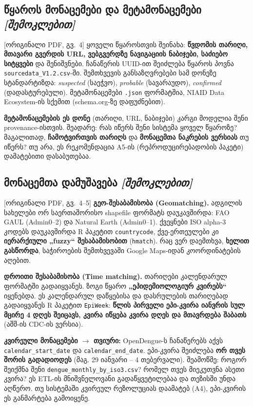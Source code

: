 \documentclass[11pt,a4paper]{article}
\newcommand{\imp}[1]{\textbf{\color{importred}#1}}
\newcommand{\pg}[1]{{\small\color{gray}[ორიგინალი PDF, გვ.~#1]}}
\begin{document}
\subsection*{წყაროს მონაცემები და მეტამონაცემები \textit{[შემოკლებით]}} \pg{4}
ყოველი წყაროსთვის შეინახა: \imp{წვდომის თარიღი, მთავარი გვერდის URL, ვებგვერდზე ნავიგაციის ნაბიჯები, საძიებო სიტყვები} და
შენიშვნები. ჩანაწერის UUID-ით შეიძლება წყაროს პოვნა \texttt{sourcedata\_V1.2.csv}-ში. შემთხვევის განსაზღვრებები სამ დონეზე
სტანდარტიზდა: \textit{suspected} (საეჭვო), \textit{probable} (სავარაუდო), \textit{confirmed} (დადასტურებული). მეტამონაცემები
\texttt{.json} ფორმატშია, NIAID Data Ecosystem-ის სქემით (schema.org-ზე დაფუძნებით).

\begin{etl}
\textbf{მეტამონაცემების ეს დონე} (თარიღი, URL, ნაბიჯები) კარგი მოდელია შენი provenance-ისთვის. შეადარე: რას იწერს შენი სისტემა
ყოველ წყაროზე? მაგალითად, \imp{ჩამოტვირთვის თარიღს} და \imp{მონაცემთა ნაკრების ვერსიას} თუ იწერს? თუ არა, ეს რეკომენდაცია A5-ის
(რეპროდუცირებადობის პაკეტი) დამატებითი დასაბუთებაა.
\end{etl}

\subsection*{მონაცემთა დამუშავება \textit{[შემოკლებით]}} \pg{4--5}
\textbf{გეო-შესაბამისობა (Geomatching).} ადგილის სახელები ორ საერთაშორისო shapefile ფორმატს დაუკავშირდა: FAO GAUL (Admin0--2)
და Natural Earth (Admin0--1). ქვეყნები ISO alpha-3 კოდებს დაუკავშირდა R პაკეტით \texttt{countrycode}, ქვე-ერთეულები კი
\imp{იერარქიული „fuzzy“ შესაბამისობით} (\texttt{hmatch}). რაც ვერ დაემთხვა, \imp{ხელით გასწორდა}, საჭიროების შემთხვევაში
Google Maps-იდან კოორდინატების აღებით.

\textbf{დროითი შესაბამისობა (Time matching).} თარიღები კალენდარულ ფორმატში გადაიყვანეს. ზოგი წყარო \imp{„ეპიდემიოლოგიურ კვირებს“}
იყენებდა. ეს კალენდარულ დაწყებისა და დასრულების თარიღებად გადაიყვანეს R პაკეტით \texttt{EpiWeek}: \imp{წლის პირველი ეპი-კვირა
იანვრის სულ მცირე 4 დღეს შეიცავს, კვირა იწყება კვირა დღეს და მთავრდება შაბათს} (აშშ-ის CDC-ის ვერსია).

\begin{alarm}
\textbf{კვირეული მონაცემები $\rightarrow$ თვიური:} OpenDengue-ს ჩანაწერებს აქვს \texttt{calendar\_start\_date} და \texttt{calendar\_end\_date}.
ეპი-კვირა შეიძლება \imp{ორ თვეს შორის გადადიოდეს} (მაგ. 29 იანვარი -- 4 თებერვალი). შეამოწმე: როგორ შეიქმნა შენი
\texttt{dengue\_monthly\_by\_iso3.csv}? რომელ თვეს მიეკუთვნა ასეთი კვირა? ეს ETL-ის მნიშვნელოვანი გადაწყვეტილებაა და თეზისში
უნდა აღწერო. თუ სისტემაში კვირეულ რეზოლუციას დაამატებ (A4), ეპი-კვირის ეს განმარტება გამოიყენე.
\end{alarm}
\end{document}
